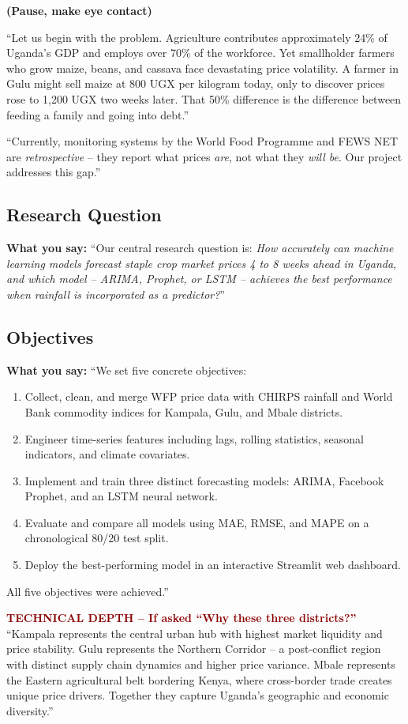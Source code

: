 \documentclass[11pt,a4paper]{article}
\begin{document}
\textbf{(Pause, make eye contact)}

``Let us begin with the problem. Agriculture contributes approximately 24\% of Uganda's GDP and employs over 70\% of the workforce. Yet smallholder farmers who grow maize, beans, and cassava face devastating price volatility. A farmer in Gulu might sell maize at 800 UGX per kilogram today, only to discover prices rose to 1,200 UGX two weeks later. That 50\% difference is the difference between feeding a family and going into debt.''

``Currently, monitoring systems by the World Food Programme and FEWS NET are \textit{retrospective} -- they report what prices \textit{are}, not what they \textit{will be}. Our project addresses this gap.''

\subsection{Research Question}
\textbf{What you say:}
``Our central research question is: \textit{How accurately can machine learning models forecast staple crop market prices 4 to 8 weeks ahead in Uganda, and which model -- ARIMA, Prophet, or LSTM -- achieves the best performance when rainfall is incorporated as a predictor?}''

\subsection{Objectives}
\textbf{What you say:}
``We set five concrete objectives:
\begin{enumerate}
    \item Collect, clean, and merge WFP price data with CHIRPS rainfall and World Bank commodity indices for Kampala, Gulu, and Mbale districts.
    \item Engineer time-series features including lags, rolling statistics, seasonal indicators, and climate covariates.
    \item Implement and train three distinct forecasting models: ARIMA, Facebook Prophet, and an LSTM neural network.
    \item Evaluate and compare all models using MAE, RMSE, and MAPE on a chronological 80/20 test split.
    \item Deploy the best-performing model in an interactive Streamlit web dashboard.
\end{enumerate}
All five objectives were achieved.''

\begin{mdframed}[backgroundcolor=red!5, linecolor=darkred]
\textcolor{darkred}{\textbf{TECHNICAL DEPTH -- If asked ``Why these three districts?''}}\\
``Kampala represents the central urban hub with highest market liquidity and price stability. Gulu represents the Northern Corridor -- a post-conflict region with distinct supply chain dynamics and higher price variance. Mbale represents the Eastern agricultural belt bordering Kenya, where cross-border trade creates unique price drivers. Together they capture Uganda's geographic and economic diversity.''
\end{mdframed}
\end{document}
